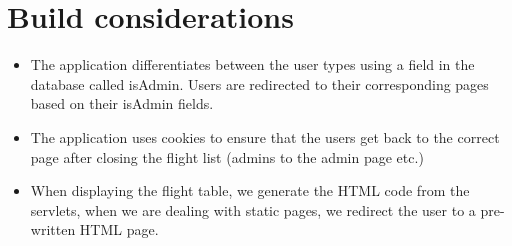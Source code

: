 \documentclass[a4paper,10pt]{report}
\begin{document}
\section{Build considerations}
\begin{itemize}
    \item The application differentiates between the user types using a field in the database called isAdmin.
    Users are redirected to their corresponding pages based on their isAdmin fields.
    \item The application uses cookies to ensure that the users get back to the correct page after closing the flight list (admins to the admin page etc.)
    \item When displaying the flight table, we generate the HTML code from the servlets, when we are dealing with static pages, we redirect the user to a pre-written HTML page.
\end{itemize}
\end{document}
